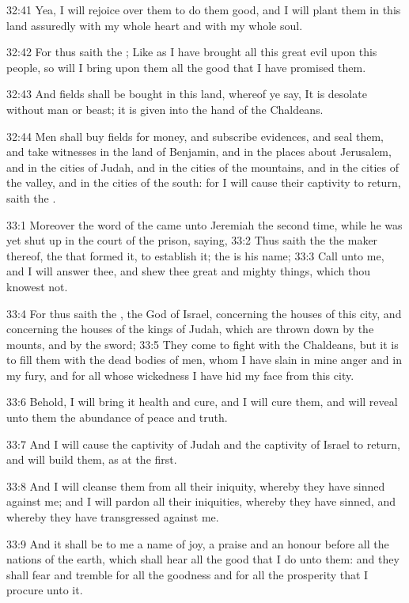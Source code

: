 32:41 Yea, I will rejoice over them to do them good, and I will plant them in this land assuredly with my whole heart and with my whole soul.

32:42 For thus saith the \LORD; Like as I have brought all this great evil upon this people, so will I bring upon them all the good that I have promised them.

32:43 And fields shall be bought in this land, whereof ye say, It is desolate without man or beast; it is given into the hand of the Chaldeans.

32:44 Men shall buy fields for money, and subscribe evidences, and seal them, and take witnesses in the land of Benjamin, and in the places about Jerusalem, and in the cities of Judah, and in the cities of the mountains, and in the cities of the valley, and in the cities of the south: for I will cause their captivity to return, saith the \LORD.

33:1 Moreover the word of the \LORD came unto Jeremiah the second time, while he was yet shut up in the court of the prison, saying, 33:2 Thus saith the \LORD the maker thereof, the \LORD that formed it, to establish it; the \LORD is his name; 33:3 Call unto me, and I will answer thee, and shew thee great and mighty things, which thou knowest not.

33:4 For thus saith the \LORD, the God of Israel, concerning the houses of this city, and concerning the houses of the kings of Judah, which are thrown down by the mounts, and by the sword; 33:5 They come to fight with the Chaldeans, but it is to fill them with the dead bodies of men, whom I have slain in mine anger and in my fury, and for all whose wickedness I have hid my face from this city.

33:6 Behold, I will bring it health and cure, and I will cure them, and will reveal unto them the abundance of peace and truth.

33:7 And I will cause the captivity of Judah and the captivity of Israel to return, and will build them, as at the first.

33:8 And I will cleanse them from all their iniquity, whereby they have sinned against me; and I will pardon all their iniquities, whereby they have sinned, and whereby they have transgressed against me.

33:9 And it shall be to me a name of joy, a praise and an honour before all the nations of the earth, which shall hear all the good that I do unto them: and they shall fear and tremble for all the goodness and for all the prosperity that I procure unto it.

